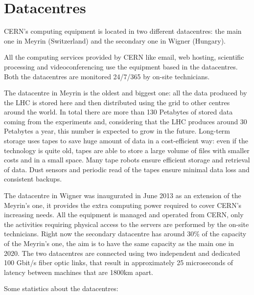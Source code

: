 \section{Datacentres}

CERN's computing equipment is located in two different datacentres: the
main one in Meyrin (Switzerland) and the secondary one in Wigner
(Hungary).

All the computing services provided by CERN like email, web hosting,
scientific processing and videoconferencing use the equipment based in the
datacentres. Both the datacentres are monitored 24/7/365 by on-site
technicians.

The datacentre in Meyrin is the oldest and biggest one: all the data
produced by the LHC is stored here and then distributed using the grid to
other centres around the world. In total there are more than 130 Petabytes
of stored data coming from the experiments and, considering that the LHC
produces around 30 Petabytes a year, this number is expected to grow in
the future. Long-term storage uses tapes to save huge amount of data in
a cost-efficient way: even if the technology is quite old, tapes are able
to store a large volume of files with smaller costs and in a small space.
Many tape robots ensure efficient storage and retrieval of data. Dust
sensors and periodic read of the tapes ensure minimal data loss and
consistent backups.

The datacentre in Wigner was inaugurated in June 2013 as an extension of
the Meyrin's one, it provides the extra computing power required to cover
CERN's increasing needs. All the equipment is managed and operated from
CERN, only the activities requiring physical access to the servers are
performed by the on-site technicians. Right now the secondary datacentre
has around 30\% of the capacity of the Meyrin's one, the aim is to have
the same capacity as the main one in 2020. The two datacentres are
connected using two independent and dedicated 100 Gbit/s fiber optic
links, that result in approximately 25 microseconds of latency between
machines that are 1800km apart.

Some statistics about the datacentres:


